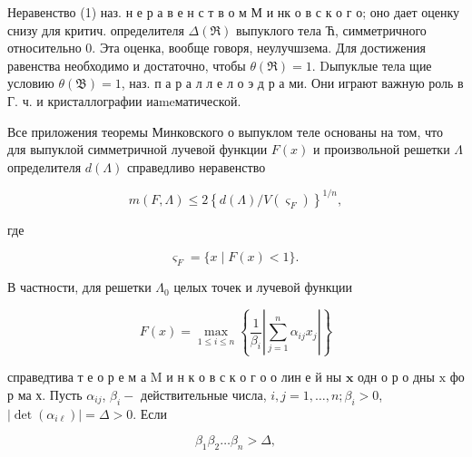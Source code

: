 \documentclass[10pt]{article}
\begin{document}
Неравенство (1) наз. н е р а в е н с т в о м М и нк о в с к о г о; оно дает оценку снизу для критич. определителя $\Delta(\Re)$ выпуклого тела Ћ, симметричного относительно 0. Эта оценка, вообще говоря, неулучшзема. Для достижения равенства необходимо и достаточно, чтобы $\theta(\mathscr{\Re})=1$. Dыпуклые тела щие условию $\theta(\mathfrak{B})=1$, наз. п а р а л л е л о э д р а ми. Они играют важную роль в Г. ч. и кристаллографии иаmeматической.



Все приложения теоремы Минковского о выпуклом теле основаны на том, что для выпуклой симметричной лучевой функции $F(x)$ и произвольной решетки $\Lambda$ определителя $d(\Lambda)$ справедливо неравенство



\[

m(F, \Lambda) \leqslant 2\left\{d(\Lambda) / V\left(\varsigma_{F}\right)\right\}^{1 / n},

\]



где



\[

\varsigma_{F}=\{x \mid F(x)<1\} \text {. }

\]



В частности, для решетки $\Lambda_{0}$ целых точек и лучевой функции



\[

F(x)=\max _{1 \leqslant i \leqslant n}\left\{\frac{1}{\beta_{i}}\left|\sum_{j=1}^{n} \alpha_{i j} x_{j}\right|\right\}

\]



справедтива т е о р е м а $\mathrm{M}$ и н к о в с к о г о о лин е й ны $\mathbf{x}$ одн $о$ р о дны $\mathrm{x}$ фо р ма х. Пусть $\alpha_{i j}$, $\beta_{i}-$ действительные числа, $i, j=1, \ldots, n ; \beta_{i}>0$, $\left|\operatorname{det}\left(\alpha_{i \ell}\right)\right|=\Delta>0$. Если



\[

\beta_{1} \beta_{2} \ldots \beta_{n}>\Delta,

\]
\end{document}
